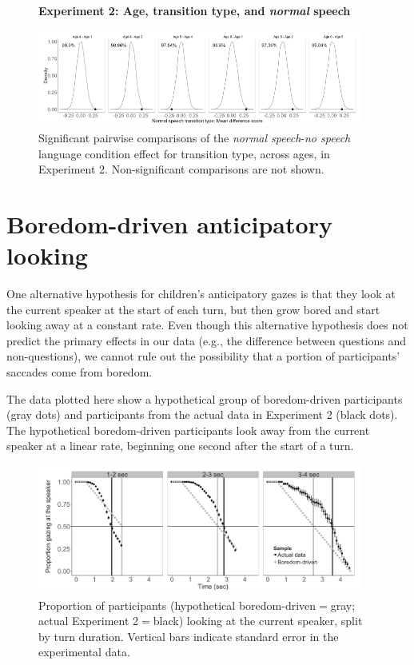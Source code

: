 \documentclass[authoryear, 12pt]{elsarticle}
\begin{document}
\begin{figure}
\begin{center}
\textbf{Experiment 2: Age, transition type, and \textit{normal} speech}\par\medskip
\includegraphics[width=0.95\textwidth]{figures/E2-child-randvsreal-ttest-normaltypesages.png}
\end{center}
\caption{Significant pairwise comparisons of the \textit{normal speech}-\textit{no speech} language condition effect for transition type, across ages, in Experiment 2. Non-significant comparisons are not shown.}
\label{fig:E2-lgagetypeinteraction}
\end{figure}

\section{Boredom-driven anticipatory looking}
\label{sec:boredlooks}
\setcounter{figure}{0}

One alternative hypothesis for children's anticipatory gazes is that they look at the current speaker at the start of each turn, but then grow bored and start looking away at a constant rate. Even though this alternative hypothesis does not predict the primary effects in our data (e.g., the difference between questions and non-questions), we cannot rule out the possibility that a portion of participants' saccades come from boredom.

The data plotted here show a hypothetical group of boredom-driven participants (gray dots) and participants from the actual data in Experiment 2 (black dots). The hypothetical boredom-driven participants look away from the current speaker at a linear rate, beginning one second after the start of a turn.

\begin{figure}[!htb]
\begin{center}
\includegraphics[width=0.95\textwidth]{figures/boredom-hypothesis.png}
\end{center}
\caption{Proportion of participants (hypothetical boredom-driven$=$gray; actual Experiment 2$=$black) looking at the current speaker, split by turn duration. Vertical bars indicate standard error in the experimental data.}
\label{fig:boredomhypothesis}
\end{figure}
\end{document}
